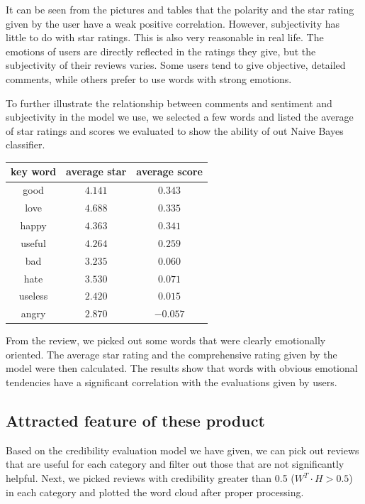 \documentclass{mcmthesis}
\begin{document}
    It can be seen from the pictures and tables that the polarity and the star rating given by the user have a weak positive correlation. However, subjectivity has little to do with star ratings. This is also very reasonable in real life. The emotions of users are directly reflected in the ratings they give, but the subjectivity of their reviews varies. Some users tend to give objective, detailed comments, while others prefer to use words with strong emotions.
    
    To further illustrate the relationship between comments and sentiment and subjectivity in the model we use, we selected a few words and listed the average of star ratings and scores we evaluated to show the ability of out Naive Bayes classifier.
    
     \begin{center}
        \begin{tabular}{|c|c|c|}
        \hline
             key word    & average star     & average score      \\ \hline
             good & $4.141$ & $0.343$ \\ \hline
             love & $4.688$ & $0.335$ \\ \hline
             happy & $4.363$ & $0.341$ \\ \hline
             useful & $4.264$ & $0.259$ \\ \hline
             bad & $3.235$ & $0.060$ \\ \hline
             hate & $3.530$ & $0.071$ \\ \hline
             useless & $2.420$ & $0.015$ \\ \hline
             angry & $2.870$ & $-0.057$ \\ \hline
        \end{tabular}
    \end{center}
    
    From the review, we picked out some words that were clearly emotionally oriented. The average star rating and the comprehensive rating given by the model were then calculated. The results show that words with obvious emotional tendencies have a significant correlation with the evaluations given by users.
    

\subsection{Attracted feature of these product}
    Based on the credibility evaluation model we have given, we can pick out reviews that are useful for each category and filter out those that are not significantly helpful. Next, we picked reviews with credibility greater than 0.5 ($W^T\cdot H > 0.5$) in each category and plotted the word cloud after proper processing.
    
\end{document}
